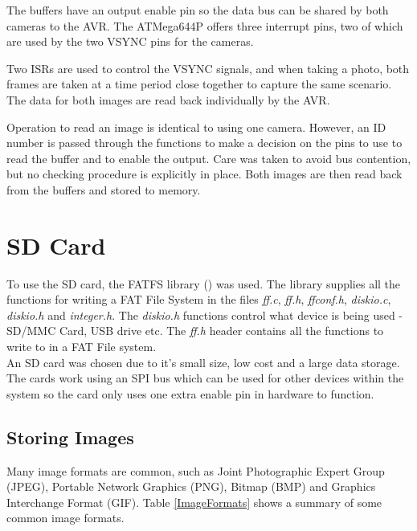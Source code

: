 The buffers have an output enable pin so the data bus can be shared by both cameras to the AVR. The ATMega644P offers three interrupt pins, two of which are used by the two VSYNC pins for the cameras.

Two ISRs are used to control the VSYNC signals, and when taking a photo, both frames are taken at a time period close together to capture the same scenario. The data for both images are read back individually by the AVR. 

Operation to read an image is identical to using one camera. However, an ID number is passed through the functions to make a decision on the pins to use to read the buffer and to enable the output. Care was taken to avoid bus contention, but no checking procedure is explicitly in place. Both images are then read back from the buffers and stored to memory. 

\section{SD Card} \label{sect:SDCard}

To use the SD card, the FATFS library (\cite{FATFS}) was used. The library supplies all the functions for writing a FAT File System in the files \textit{ff.c}, \textit{ff.h}, \textit{ffconf.h}, \textit{diskio.c}, \textit{diskio.h} and \textit{integer.h}. The \textit{diskio.h} functions control what device is being used - SD/MMC Card, USB drive etc. The \textit{ff.h} header contains all the functions to write to in a FAT File system. 
\\
An SD card was chosen due to it's small size, low cost and a large data storage. The cards work using an SPI bus which can be used for other devices within the system so the card only uses one extra enable pin in hardware to function. 

\subsection{Storing Images}

Many image formats are common, such as Joint Photographic Expert Group (JPEG), Portable Network Graphics (PNG), Bitmap (BMP) and Graphics Interchange Format (GIF). Table \ref{ImageFormats} shows a summary of some common image formats.


